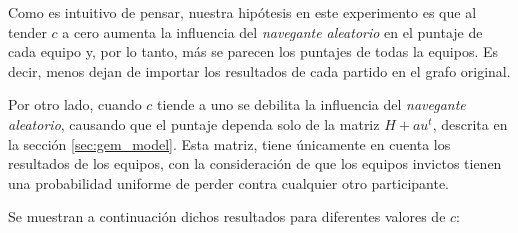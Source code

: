 Como es intuitivo de pensar, nuestra hipótesis en este experimento es que al tender
$c$ a cero aumenta la influencia del \textit{navegante aleatorio} en el puntaje de
cada equipo y, por lo tanto, más se parecen los puntajes de todas la equipos.
Es decir, menos dejan de importar los resultados de cada partido en el grafo original.

Por otro lado, cuando $c$ tiende a uno se debilita la influencia del \textit{navegante
aleatorio}, causando que el puntaje dependa solo de la matriz $H + au^{t}$, descrita
en la sección \ref{sec:gem_model}. Esta matriz, tiene únicamente en cuenta los
resultados de los equipos, con la consideración de que los equipos invictos tienen
una probabilidad uniforme de perder contra cualquier otro participante.

Se muestran a continuación dichos resultados para diferentes valores de $c$:

